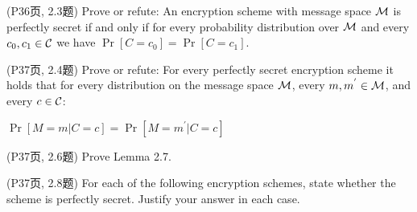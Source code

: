 \begin{questions}
    \question (P36页, 2.3题) Prove or refute: An encryption scheme with message space $\mathcal{M}$ is perfectly secret if and only if for every probability distribution over $\mathcal{M}$ and every $c_0, c_1 \in \mathcal{C}$ we have $\Pr[C=c_0] = \Pr[C=c_1]$.

        \begin{solution}
        \end{solution}

    \question (P37页, 2.4题) Prove or refute: For every perfectly secret encryption scheme it holds that for every distribution on the message space $\mathcal{M}$, every $m,m^{'} \in \mathcal{M}$, and every $c \in \mathcal{C}$:

        \begin{center} $\Pr[M=m|C=c] = \Pr[M=m^{'}|C=c]$ \end{center}

        \begin{solution}
        \end{solution}

    \question (P37页, 2.6题) Prove Lemma 2.7.

        \begin{solution}
        \end{solution}

    \question (P37页, 2.8题) For each of the following encryption schemes, state whether the scheme is perfectly secret. Justify your answer in each case.
\end{questions}
